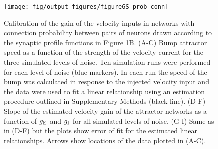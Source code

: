 \documentclass[a4paper,12pt]{article}
\newcommand{\ssc}[3]{\ensuremath{#1_{\text{#2}_{\text{#3}}}}}
\newcommand{\gE      }{\ssc{g}      {\scriptsize{E}}{}}
\newcommand{\gI      }{\ssc{g}      {\scriptsize{I}}{}}
\begin{document}
\begin{figure}[ht!]
    \internallinenumbers
    \centering
        \texttt{[image: fig/output\_figures/figure6S\_prob\_conn]}
    \caption{Calibration of the gain of the velocity inputs in networks with
    connection probability between pairs of neurons drawn according to the
    synaptic profile functions in Figure 1B. (A-C) Bump attractor speed as a
    function of the strength of the velocity current for the three simulated
    levels of noise. Ten simulation runs were performed for each level of noise
    (blue markers). In each run the speed of the bump was calculated in
    response to the injected velocity input and the data were used to fit a
    linear relationship using an estimation procedure outlined in Supplementary
    Methods (black line). (D-F) Slope of the estimated velocity gain of the
    attractor networks as a function of $\gE$ and $\gI$ for all simulated
    levels of noise. (G-I) Same as in (D-F) but the plots show error of fit for
    the estimated linear relationships. Arrows show locations of the data
    plotted in (A-C).}
\end{figure}

\clearpage

%
\end{document}
